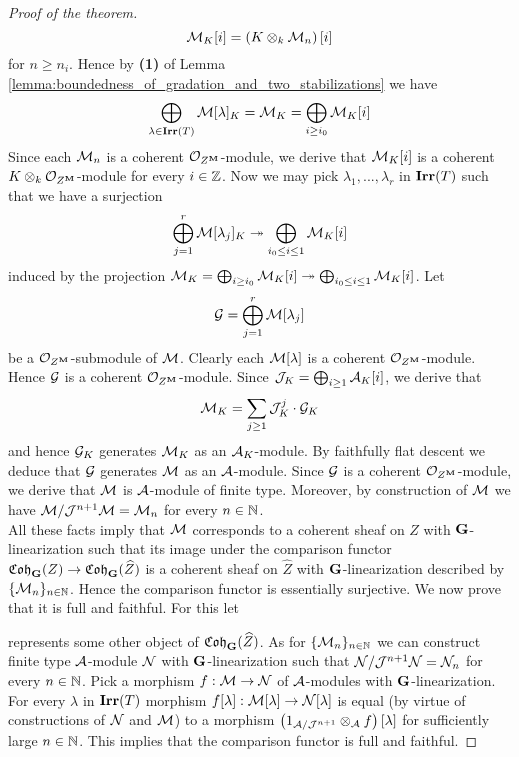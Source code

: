 \begin{proof}[Proof of the theorem]
$${\mathcal M}_K[i] = \left(K\otimes_k{\mathcal M}_n\right)[i]$$
for $n\geq n_i$. Hence by \textbf{(1)} of Lemma \ref{lemma:boundedness_of_gradation_and_two_stabilizations} we have
$$\bigoplus_{\lambda\in \mathbf{Irr}(T)}{\mathcal M}[\lambda]_K = {\mathcal M}_K = \bigoplus_{i\geq i_0}{\mathcal M}_K[i]$$
Since each ${\mathcal M}_n$ is a coherent ${\mathcal O}_{Z^{\mathbf{M}}}$-module, we derive that ${\mathcal M}_K[i]$ is a coherent $K\otimes_k{\mathcal O}_{Z^{\mathbf{M}}}$-module for every $i\in {\mathbb Z}$. Now we may pick $\lambda_1,...,\lambda_r$ in $\mathbf{Irr}(T)$ such that we have a surjection
$$\bigoplus_{j=1}^r{\mathcal M}[\lambda_j]_K \twoheadrightarrow \bigoplus_{i_0\leq i\leq 1}{\mathcal M}_K[i]$$
induced by the projection ${\mathcal M}_K = \bigoplus_{i\geq i_0}{\mathcal M}_K[i]\twoheadrightarrow \bigoplus_{i_0\leq i\leq 1}{\mathcal M}_K[i]$. Let
$${\mathcal G} = \bigoplus_{j=1}^r{\mathcal M}[\lambda_j]$$
be a ${\mathcal O}_{Z^{\mathbf{M}}}$-submodule of ${\mathcal M}$. Clearly each ${\mathcal M}[\lambda]$ is a coherent ${\mathcal O}_{Z^{\mathbf{M}}}$-module. Hence ${\mathcal G}$ is a coherent ${\mathcal O}_{Z^{\mathbf{M}}}$-module. Since ${\mathcal J}_K = \bigoplus_{i\geq 1}{\mathcal A}_K[i]$, we derive that
$${\mathcal M}_K = \sum_{j\geq 1}{\mathcal J}_K^j\cdot {\mathcal G}_K$$
and hence ${\mathcal G}_K$ generates ${\mathcal M}_K$ as an ${\mathcal A}_K$-module. By faithfully flat descent we deduce that ${\mathcal G}$ generates ${\mathcal M}$ as an ${\mathcal A}$-module. Since ${\mathcal G}$ is a coherent ${\mathcal O}_{Z^{\mathbf{M}}}$-module, we derive that ${\mathcal M}$ is ${\mathcal A}$-module of finite type. Moreover, by construction of ${\mathcal M}$ we have ${\mathcal M}/{\mathcal J}^{n+1}{\mathcal M} = {\mathcal M}_{n}$ for every $n\in {\mathbb N}$.\\
All these facts imply that ${\mathcal M}$ corresponds to a coherent sheaf on $Z$ with $\mathbf{G}$-linearization such that its image under the comparison functor $\mathfrak{Coh}_{\mathbf{G}}(Z)\rightarrow \mathfrak{Coh}_{\mathbf{G}}(\widehat{Z})$ is a coherent sheaf on $\widehat{Z}$ with $\mathbf{G}$-linearization described by $\{{\mathcal M}_n\}_{n\in {\mathbb N}}$. Hence the comparison functor is essentially surjective. We now prove that it is full and faithful. For this let
\begin{center}
\end{center}
represents some other object of $\mathfrak{Coh}_{\mathbf{G}}(\widehat{Z})$. As for $\{{\mathcal M}_n\}_{n\in {\mathbb N}}$ we can construct finite type ${\mathcal A}$-module ${\mathcal N}$ with $\mathbf{G}$-linearization such that ${\mathcal N}/{\mathcal J}^{n+1}{\mathcal N} = {\mathcal N}_n$ for every $n\in {\mathbb N}$. Pick a morphism $f:{\mathcal M}\rightarrow {\mathcal N}$ of ${\mathcal A}$-modules with $\mathbf{G}$-linearization. For every $\lambda$ in $\mathbf{Irr}(T)$ morphism $f[\lambda]:{\mathcal M}[\lambda]\rightarrow {\mathcal N}[\lambda]$ is equal (by virtue of constructions of ${\mathcal N}$ and ${\mathcal M}$) to a morphism $\left(1_{{\mathcal A}/{\mathcal J}^{n+1}}\otimes_{{\mathcal A}}f\right)[\lambda]$ for sufficiently large $n\in {\mathbb N}$. This implies that the comparison functor is full and faithful.
\end{proof}


